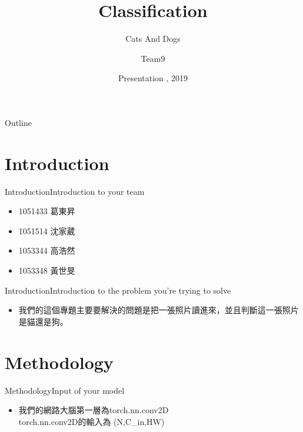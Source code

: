 \documentclass{beamer}
\title{Classification}
\subtitle{Cats And Dogs}
\author{Team9}
\date{Presentation , 2019}
\begin{document}
\begin{frame}
  \titlepage
\end{frame}

\begin{frame}{Outline}
  \tableofcontents

\end{frame}




\section{Introduction}


\begin{frame}{Introduction}{Introduction to your team}
\begin{CJK*}{UTF8}{bsmi}
  \begin{itemize}
  \item {
    1051433 葛東昇  
  }
  \item {
    1051514 沈家葳
  }
  \item {
    1053344 高浩然
  }
  \item {
    1053348 黃世旻
  }
  \end{itemize}
\end{CJK*}
\end{frame}

\begin{frame}{Introduction}{Introduction to the problem you're trying to solve  }
\begin{CJK*}{UTF8}{bsmi}
\begin{itemize}
\item{
我們的這個專題主要要解決的問題是把一張照片讀進來，並且判斷這一張照片是貓還是狗。
}
\end{itemize}
\end{CJK*}
\end{frame}



\section{Methodology}

\begin{frame}{Methodology}{Input of your model }
\begin{CJK*}{UTF8}{bsmi}
  \begin{itemize}
  \item {
我們的網路大腦第一層為torch.nn.conv2D\\
torch.nn.conv2D的輸入為 (N,C\_in,HW)
  }
  \end{itemize}
\end{CJK*}
\end{frame}
\end{document}
